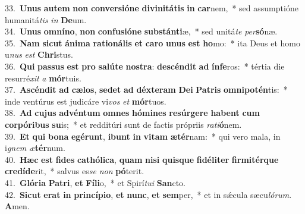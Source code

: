 {33.~}\textbf{U}\textbf{nus} \textbf{au}\textbf{tem} \textbf{non} \textbf{con}\textbf{ver}\textbf{si}\textbf{ó}\textbf{ne} \textbf{di}\textbf{vi}\textbf{ni}\textbf{tá}\textbf{tis} \textbf{in} \textbf{car}nem,~* sed assumptióne humanitá\textit{tis} \textit{in} \textbf{De}um.\\
{34.~}\textbf{U}\textbf{nus} \textbf{om}\textbf{ní}\textbf{no}, \textbf{non} \textbf{con}\textbf{fu}\textbf{si}\textbf{ó}\textbf{ne} \textbf{sub}\textbf{stán}\textbf{ti}æ,~* sed unitá\textit{te} \textit{per}\textbf{só}næ.\\
{35.~}\textbf{Nam} \textbf{si}\textbf{cut} \textbf{á}\textbf{ni}\textbf{ma} \textbf{ra}\textbf{ti}\textbf{o}\textbf{ná}\textbf{lis} \textbf{et} \textbf{ca}\textbf{ro} \textbf{u}\textbf{nus} \textbf{est} \textbf{ho}mo:~* ita Deus et homo u\textit{nus} \textit{est} \textbf{Chri}stus.\\
{36.~}\textbf{Qui} \textbf{pas}\textbf{sus} \textbf{est} \textbf{pro} \textbf{sa}\textbf{lú}\textbf{te} \textbf{no}\textbf{stra}: \textbf{de}\textbf{scén}\textbf{dit} \textbf{ad} \textbf{ín}\textbf{fe}ros:~* tértia die resurré\textit{xit} \textit{a} \textbf{mór}tuis.\\
{37.~}\textbf{A}\textbf{scén}\textbf{dit} \textbf{ad} \textbf{cæ}\textbf{los}, \textbf{se}\textbf{det} \textbf{ad} \textbf{déx}\textbf{te}\textbf{ram} \textbf{De}\textbf{i} \textbf{Pa}\textbf{tris} \textbf{om}\textbf{ni}\textbf{po}\textbf{tén}tis:~* inde ventúrus est judicáre vi\textit{vos} \textit{et} \textbf{mór}tuos.\\
{38.~}\textbf{Ad} \textbf{cu}\textbf{jus} \textbf{ad}\textbf{vén}\textbf{tum} \textbf{om}\textbf{nes} \textbf{hó}\textbf{mi}\textbf{nes} \textbf{re}\textbf{súr}\textbf{ge}\textbf{re} \textbf{ha}\textbf{bent} \textbf{cum} \textbf{cor}\textbf{pó}\textbf{ri}\textbf{bus} \textbf{su}is;~* et redditúri sunt de factis própriis \textit{ra}\textit{ti}\textbf{ó}nem.\\
{39.~}\textbf{Et} \textbf{qui} \textbf{bo}\textbf{na} \textbf{e}\textbf{gé}\textbf{runt}, \textbf{i}\textbf{bunt} \textbf{in} \textbf{vi}\textbf{tam} \textbf{æ}\textbf{tér}nam:~* qui vero mala, in i\textit{gnem} \textit{æ}\textbf{tér}num.\\
{40.~}\textbf{Hæc} \textbf{est} \textbf{fi}\textbf{des} \textbf{ca}\textbf{thó}\textbf{li}\textbf{ca}, \textbf{quam} \textbf{ni}\textbf{si} \textbf{quis}\textbf{que} \textbf{fi}\textbf{dé}\textbf{li}\textbf{ter} \textbf{fir}\textbf{mi}\textbf{tér}\textbf{que} \textbf{cre}\textbf{dí}\textbf{de}rit,~* salvus es\textit{se} \textit{non} \textbf{pó}terit.\\
{41.~}\textbf{Gló}\textbf{ri}\textbf{a} \textbf{Pa}\textbf{tri}, \textbf{et} \textbf{Fí}\textbf{li}o,~* et Spirí\textit{tu}\textit{i} \textbf{San}cto.\\
{42.~}\textbf{Si}\textbf{cut} \textbf{e}\textbf{rat} \textbf{in} \textbf{prin}\textbf{cí}\textbf{pi}\textbf{o}, \textbf{et} \textbf{nunc}, \textbf{et} \textbf{sem}per,~* et in sǽcula sæcu\textit{ló}\textit{rum}. \textbf{A}men.\\
